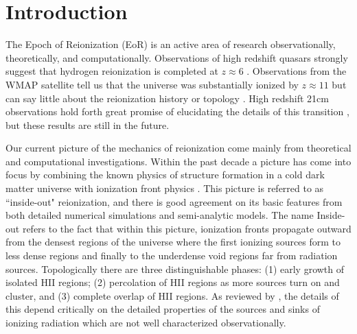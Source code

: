 \documentclass[letterpaper,10pt]{article}
\renewcommand{\(}{\left(}
\renewcommand{\)}{\right)}
\begin{document}
\section{Introduction}
\label{sec:introduction}


The Epoch of Reionization (EoR) is an active area of research observationally,
theoretically, and computationally. Observations  of high redshift quasars
strongly suggest that hydrogen reionization is completed at $z \approx 6$ \citep{FanCarilliKeating2006}. 
Observations from the WMAP satellite tell us that the universe was substantially 
ionized by $z \approx 11$ but can say little about the
reionization history or topology \citep{JarosikEtal2011_WMAP7}. 
High redshift 21cm observations hold forth great promise of elucidating the details of this transition \citep{BarkanaLoeb2007}, but these results are still in the future. 

Our current picture of the mechanics 
of reionization come mainly from theoretical and computational investigations.
Within the past decade a picture has come into focus by combining the
known physics of structure formation in a cold dark matter universe with
ionization front physics \citep{Ciardietal2003,Ilievetal2006,TracGnedin2011}. This picture is referred to
as ``inside-out" reionization, and there is good agreement on its basic
features from both detailed numerical simulations and semi-analytic models.
The name Inside-out refers to the fact that within this picture, ionization fronts propagate
outward from the densest regions of the universe where the first ionizing
sources form to less dense regions and finally to the underdense void
regions far from radiation sources.
Topologically there are three distinguishable phases: (1) early
growth of isolated H{\footnotesize II} regions; (2) percolation of H{\footnotesize II} regions as more sources
turn on and cluster, and (3) complete overlap of H{\footnotesize II} regions. As reviewed by
\citep{TracGnedin2011}, the details of this depend critically
on the  detailed properties of the sources and sinks of ionizing radiation which are
not well characterized observationally. 
\end{document}
